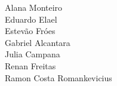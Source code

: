 
Alana Monteiro\\
Eduardo Elael\\
Estevão Fróes\\
Gabriel Alcantara\\
Julia Campana\\
Renan Freitas\\
Ramon Costa Romankevicius\\
